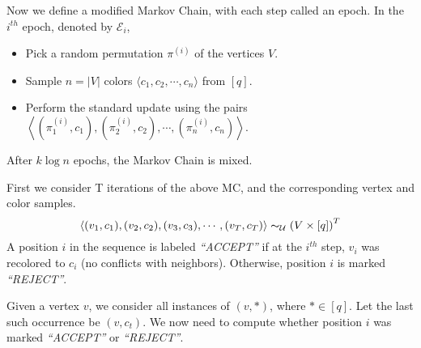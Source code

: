 Now we define a modified Markov Chain, with each step called an epoch.
In the $i^{th}$ epoch, denoted by $\mathcal E_i$,
\begin{itemize}
    \item Pick a random permutation $\pi^{(i)}$ of the vertices $V$.
    \item Sample $n = |V|$ colors $ \langle c_1, c_2,\cdots, c_n \rangle$ from $[q]$.
    \item Perform the standard update using the pairs
          $\left\langle (\pi^{(i)}_1, c_1), (\pi^{(i)}_2, c_2), \cdots, (\pi^{(i)}_n, c_n)\right\rangle$.
\end{itemize}

\begin{theorem}
\label{thm:modified_mixing}
After $k\log n$ epochs, the Markov Chain is mixed.
\end{theorem}



First we consider T iterations of the above MC, and the corresponding vertex and color samples.
\[
\left\langle (v_1, c_1), (v_2, c_2), (v_3, c_3), \cdots, (v_T, c_T)\right\rangle \thicksim_{\mathcal U} \left( V\times [q]\right)^T
\]
A position $i$ in the sequence is labeled \emph{``ACCEPT''} if at the $i^{th}$ step,
$v_i$ was recolored to $c_i$ (no conflicts with neighbors).
Otherwise, position $i$ is marked \emph{``REJECT''}.

Given a vertex $v$, we consider all instances of $(v, *)$, where $*\in [q]$.
Let the last such occurrence be $(v, c_t)$.
We now need to compute whether position $i$ was marked \emph{``ACCEPT''} or \emph{``REJECT''}.
